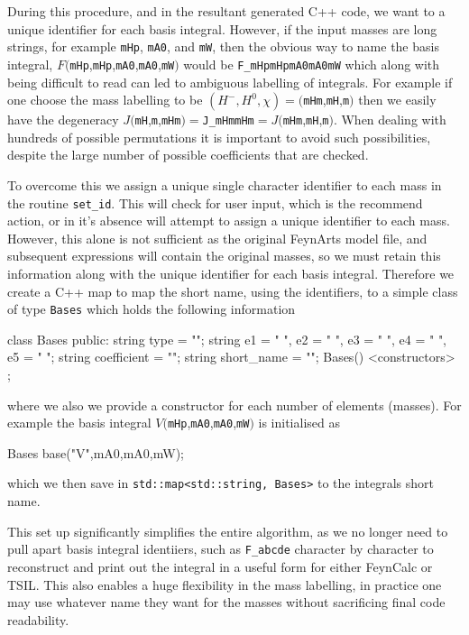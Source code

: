 During this procedure, and in the resultant generated C++ code, we want to a unique identifier for each basis integral.  However, if the input masses are long strings, for example \lstinline{mHp}, \lstinline{mA0}, and \lstinline{mW}, then the obvious way to name the basis integral, $F($\lstinline{mHp},\lstinline{mHp},\lstinline{mA0},\lstinline{mA0},\lstinline{mW}$)$ would be \lstinline{F_mHpmHpmA0mA0mW} which along with being difficult to read can led to ambiguous labelling of integrals.  For example if one choose the mass labelling to be $(H^-, H^0, \chi ) = ($\lstinline{mHm},\lstinline{mH},\lstinline{m}$)$ then we easily have the degeneracy $J($\lstinline{mH},\lstinline{m},\lstinline{mHm}$) =  $\lstinline{J_mHmmHm}$ = J($\lstinline{mHm},\lstinline{mH},\lstinline{m}$)$.  When dealing with hundreds of possible permutations it is important to avoid such possibilities, despite the large number of possible coefficients that are checked.

To overcome this we assign a unique single character identifier to each mass in the routine \lstinline{set_id}.  This will check for user input, which is the recommend action, or in it's absence will attempt to assign a unique identifier to each mass.  However, this alone is not sufficient as the original FeynArts model file, and subsequent expressions will contain the original masses, so we must retain this information along with the unique identifier for each basis integral.  Therefore we create a C++ map to map the short name, using the identifiers, to a simple class of type \lstinline{Bases} which holds the following information
\begin{lstcpp}
class Bases
{
public:
string type = "";
string e1 = " ", e2 = " ", e3 = " ", e4 = " ", e5 = " ";
string coefficient = "";
string short_name = "";
Bases() {}
<constructors>
};
\end{lstcpp}
where we also we provide a constructor for each number of elements (masses).  For example the basis integral $V($\lstinline{mHp},\lstinline{mA0},\lstinline{mA0},\lstinline{mW}$)$ is initialised as\begin{lstcpp}
Bases base("V",mA0,mA0,mW);
\end{lstcpp}
which we then save in \lstinline{std::map<std::string, Bases>} to the integrals short name.

This set up significantly simplifies the entire algorithm, as we no longer need to pull apart basis integral identiiers, such as \lstinline{F_abcde} character by character to reconstruct and print out the integral in a useful form for either FeynCalc or TSIL.  This also enables a huge flexibility in the mass labelling, in practice one may use whatever name they want for the masses without sacrificing final code readability.



